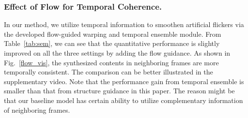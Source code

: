 \subsubsection{Effect of Flow for Temporal Coherence.}

In our method, we utilize temporal information to smoothen artificial flickers via the developed flow-guided warping and temporal ensemble module. 
From Table~\ref{tab:sem}, we can see that the quantitative performance is slightly improved on all the three settings by adding the flow guidance. 
As shown in Fig.~\ref{flow_vis}, the synthesized contents in neighboring frames are more temporally consistent.
The comparison can be better illustrated in the supplementary video.
Note that the performance gain from temporal ensemble is smaller than that from structure guidance in this paper.
The reason might be that our baseline model has certain ability to utilize complementary information of neighboring frames.

 














 

